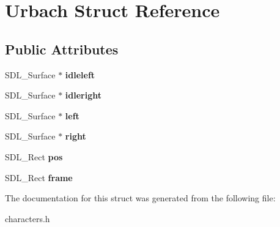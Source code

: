 \hypertarget{structUrbach}{}\section{Urbach Struct Reference}
\label{structUrbach}
\subsection*{Public Attributes}
\begin{DoxyCompactItemize}
\item 
S\+D\+L\+\_\+\+Surface $\ast$ {\bfseries idleleft}\hypertarget{structUrbach_aceb4c9284463ad8693848a6d25ab340c}{}\label{structUrbach_aceb4c9284463ad8693848a6d25ab340c}

\item 
S\+D\+L\+\_\+\+Surface $\ast$ {\bfseries idleright}\hypertarget{structUrbach_a56fa219092106a543ac86b2cc685258b}{}\label{structUrbach_a56fa219092106a543ac86b2cc685258b}

\item 
S\+D\+L\+\_\+\+Surface $\ast$ {\bfseries left}\hypertarget{structUrbach_a8d3d79023f3ffe73df98e2efabf76353}{}\label{structUrbach_a8d3d79023f3ffe73df98e2efabf76353}

\item 
S\+D\+L\+\_\+\+Surface $\ast$ {\bfseries right}\hypertarget{structUrbach_ade397b31b3b2bb6a54000fd9e33c0a69}{}\label{structUrbach_ade397b31b3b2bb6a54000fd9e33c0a69}

\item 
S\+D\+L\+\_\+\+Rect {\bfseries pos}\hypertarget{structUrbach_a21dd6e2a733848b8d283cc41e8ef3a91}{}\label{structUrbach_a21dd6e2a733848b8d283cc41e8ef3a91}

\item 
S\+D\+L\+\_\+\+Rect {\bfseries frame}\hypertarget{structUrbach_aafc4a8cf83805978b35a802b98d0a211}{}\label{structUrbach_aafc4a8cf83805978b35a802b98d0a211}

\end{DoxyCompactItemize}


The documentation for this struct was generated from the following file\+:\begin{DoxyCompactItemize}
\item 
characters.\+h\end{DoxyCompactItemize}
